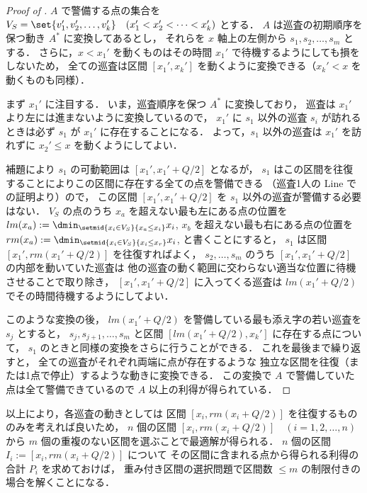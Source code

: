 \begin{proof}[Proof of ]
	$A$ で警備する点の集合を
	$V_S = \set{ v_1', v_2', \ldots, v_k' }
	 \quad (  x_1' < x_2' < \cdots < x_k'  )$
	とする．
	$A$ は巡査の初期順序を保つ動き $A^*$ に変換してあるとし，
	それらを $x$ 軸上の左側から $s_1, s_2, \ldots, s_m$ とする．
	さらに，$x < x_1'$ を動くものはその時間 $x_1'$ で待機するようにしても損をしないため，
	全ての巡査は区間 $[x_1', x_k']$ を動くように変換できる（$x_k' < x$ を動くものも同様）．

	まず $x_1'$ に注目する．
	いま，巡査順序を保つ $A^*$ に変換しており，
	巡査は $x_1'$ より左には進まないように変換しているので，
	$x_1'$ に $s_1$ 以外の巡査 $s_i$ が訪れるときは必ず $s_1$ が $x_1'$ に存在することになる．
	よって，$s_1$ 以外の巡査は $x_1'$ を訪れずに $x_2' \leq x$ を動くようにしてよい．

	補題により $s_1$ の可動範囲は
	$[x_1', x_1' + Q/2]$ となるが，
	$s_1$ はこの区間を往復することによりこの区間に存在する全ての点を警備できる
	（巡査1人の Line での証明より）ので，
	この区間 $[x_1', x_1' + Q/2]$ を $s_1$ 以外の巡査が警備する必要はない．
	$V_S$ の点のうち
	$x_a$ を超えない最も左にある点の位置を
	$lm(x_a) := \dmin_{ \setmid{ x_i \in V_S }{ x_a \leq x_i } } x_i$, 
	$x_b$ を超えない最も右にある点の位置を
	$rm(x_a) := \dmin_{ \setmid{ x_i \in V_S }{ x_i \leq x_r } } x_i$, 
	と書くことにすると，
	$s_1$ は区間 $[x_1', rm(x_1' + Q/2)]$ を往復すればよく，
	$s_2, \ldots, s_m$ のうち
	$[x_1', x_1' + Q/2]$ の内部を動いていた巡査は
	他の巡査の動く範囲に交わらない適当な位置に待機させることで取り除き，
	$[x_1', x_1' + Q/2]$ に入ってくる巡査は
	$lm(x_1' + Q/2)$ でその時間待機するようにしてよい．

	このような変換の後，
	$lm(x_1' + Q/2)$ を警備している最も添え字の若い巡査を $s_j$ とすると，
	$s_j, s_{j + 1}, \ldots, s_m$ と区間 $[lm(x_1' + Q/2), x_k']$
	に存在する点について， $s_1$ のときと同様の変換をさらに行うことができる．
	これを最後まで繰り返すと，
	全ての巡査がそれぞれ両端に点が存在するような
	独立な区間を往復（または1点で停止）するような動きに変換できる．
	この変換で $A$ で警備していた点は全て警備できているので $A$ 以上の利得が得られている．
\end{proof}


以上により，各巡査の動きとしては
区間 $[x_i, rm(x_i + Q/2)]$ を往復するもののみを考えれば良いため，
$n$ 個の区間 $[x_i, rm(x_i + Q/2)] \quad (i = 1, 2, \ldots, n)$ から
$m$ 個の重複のない区間を選ぶことで最適解が得られる．
$n$ 個の区間 $I_i := [x_i, rm(x_i + Q/2)]$ について
その区間に含まれる点から得られる利得の合計 $P_i$ を求めておけば，
重み付き区間の選択問題で区間数 $\leq m$ の制限付きの場合を解くことになる．

